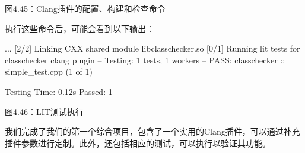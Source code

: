 \begin{center}
图4.45：Clang插件的配置、构建和检查命令
\end{center}

执行这些命令后，可能会看到以下输出：

\begin{shell}
...
[2/2] Linking CXX shared module libclasschecker.so
[0/1] Running lit tests for classchecker clang plugin
-- Testing: 1 tests, 1 workers --
PASS: classchecker :: simple_test.cpp (1 of 1)

Testing Time: 0.12s
Passed: 1
\end{shell}

\begin{center}
图4.46：LIT测试执行
\end{center}

我们完成了我们的第一个综合项目，包含了一个实用的Clang插件，可以通过补充插件参数进行定制。此外，还包括相应的测试，可以执行以验证其功能。








